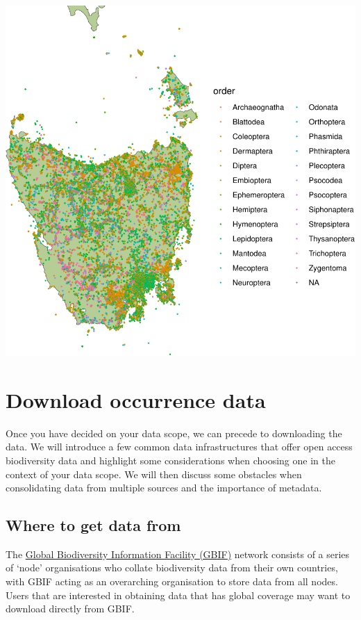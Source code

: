 \documentclass[
  letterpaper,
  DIV=11,
  numbers=noendperiod,
  oneside]{scrreprt}
\begin{document}
\includegraphics{./scope_files/figure-pdf/unnamed-chunk-2-1.pdf}


\hypertarget{sec-download-data}{%
\chapter{Download occurrence data}\label{sec-download-data}}

Once you have decided on your data scope, we can precede to downloading
the data. We will introduce a few common data infrastructures that offer
open access biodiversity data and highlight some considerations when
choosing one in the context of your data scope. We will then discuss
some obstacles when consolidating data from multiple sources and the
importance of metadata.

\hypertarget{where-to-get-data-from}{%
\section{Where to get data from}\label{where-to-get-data-from}}

The \href{https://www.gbif.org/}{Global Biodiversity Information
Facility (GBIF)} network consists of a series of `node' organisations
who collate biodiversity data from their own countries, with GBIF acting
as an overarching organisation to store data from all nodes. Users that
are interested in obtaining data that has global coverage may want to
download directly from GBIF.
\end{document}
